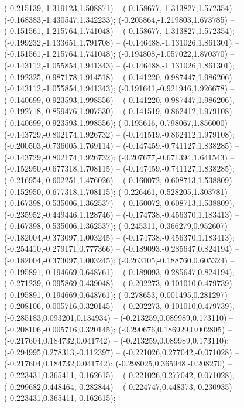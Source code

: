  (-0.215139,-1.319123,1.508871) -- (-0.158677,-1.313827,1.572354) -- (-0.168383,-1.430547,1.342233);
 (-0.205864,-1.219803,1.673785) -- (-0.151561,-1.215764,1.741048) -- (-0.158677,-1.313827,1.572354);
 (-0.199232,-1.133651,1.791708) -- (-0.146488,-1.131026,1.861301) -- (-0.151561,-1.215764,1.741048);
 (-0.194808,-1.057022,1.870370) -- (-0.143112,-1.055854,1.941343) -- (-0.146488,-1.131026,1.861301);
 (-0.192325,-0.987178,1.914518) -- (-0.141220,-0.987447,1.986206) -- (-0.143112,-1.055854,1.941343);
 (-0.191641,-0.921946,1.926678) -- (-0.140699,-0.923593,1.998556) -- (-0.141220,-0.987447,1.986206);
 (-0.192718,-0.859476,1.907530) -- (-0.141519,-0.862412,1.979108) -- (-0.140699,-0.923593,1.998556);
 (-0.195616,-0.798067,1.856000) -- (-0.143729,-0.802174,1.926732) -- (-0.141519,-0.862412,1.979108);
 (-0.200503,-0.736005,1.769114) -- (-0.147459,-0.741127,1.838285) -- (-0.143729,-0.802174,1.926732);
 (-0.207677,-0.671394,1.641543) -- (-0.152950,-0.677318,1.708115) -- (-0.147459,-0.741127,1.838285);
 (-0.216954,-0.602251,1.476026) -- (-0.160072,-0.608713,1.538809) -- (-0.152950,-0.677318,1.708115);
 (-0.226461,-0.528205,1.303781) -- (-0.167398,-0.535006,1.362537) -- (-0.160072,-0.608713,1.538809);
 (-0.235952,-0.449446,1.128746) -- (-0.174738,-0.456370,1.183413) -- (-0.167398,-0.535006,1.362537);
 (-0.245311,-0.366279,0.952607) -- (-0.182004,-0.373097,1.003245) -- (-0.174738,-0.456370,1.183413);
 (-0.254410,-0.279171,0.777366) -- (-0.189093,-0.285647,0.824194) -- (-0.182004,-0.373097,1.003245);
 (-0.263105,-0.188760,0.605324) -- (-0.195891,-0.194669,0.648761) -- (-0.189093,-0.285647,0.824194);
 (-0.271239,-0.095869,0.439048) -- (-0.202273,-0.101010,0.479739) -- (-0.195891,-0.194669,0.648761);
 (-0.278653,-0.001495,0.281297) -- (-0.208106,-0.005716,0.320145) -- (-0.202273,-0.101010,0.479739);
 (-0.285183,0.093201,0.134934) -- (-0.213259,0.089989,0.173110) -- (-0.208106,-0.005716,0.320145);
 (-0.290676,0.186929,0.002805) -- (-0.217604,0.184732,0.041742) -- (-0.213259,0.089989,0.173110);
 (-0.294995,0.278313,-0.112397) -- (-0.221026,0.277042,-0.071028) -- (-0.217604,0.184732,0.041742);
 (-0.298025,0.365948,-0.208270) -- (-0.223431,0.365411,-0.162615) -- (-0.221026,0.277042,-0.071028);
 (-0.299682,0.448464,-0.282844) -- (-0.224747,0.448373,-0.230935) -- (-0.223431,0.365411,-0.162615);
